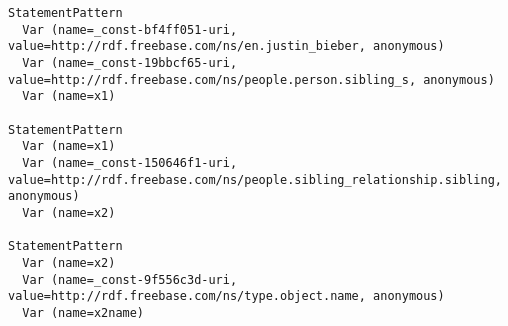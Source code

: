 \begin{verbatim}
StatementPattern
  Var (name=_const-bf4ff051-uri, value=http://rdf.freebase.com/ns/en.justin_bieber, anonymous)
  Var (name=_const-19bbcf65-uri, value=http://rdf.freebase.com/ns/people.person.sibling_s, anonymous)
  Var (name=x1)

StatementPattern
  Var (name=x1)
  Var (name=_const-150646f1-uri, value=http://rdf.freebase.com/ns/people.sibling_relationship.sibling, anonymous)
  Var (name=x2)

StatementPattern
  Var (name=x2)
  Var (name=_const-9f556c3d-uri, value=http://rdf.freebase.com/ns/type.object.name, anonymous)
  Var (name=x2name)
\end{verbatim}












